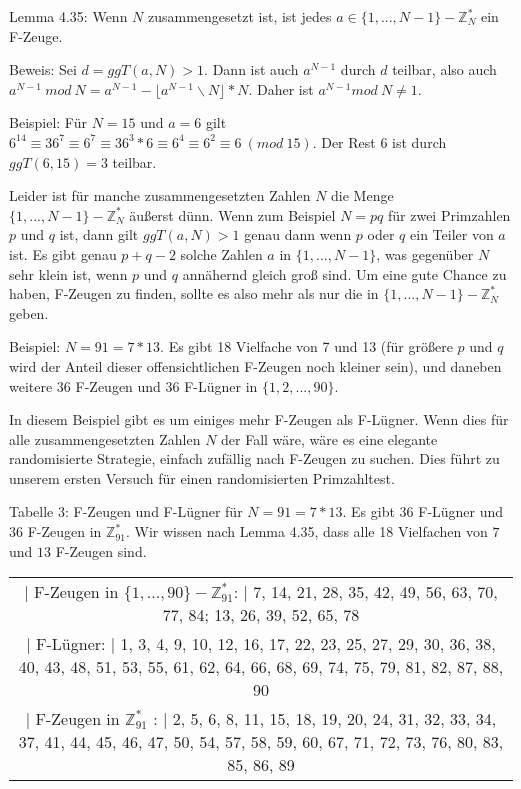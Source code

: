 \documentclass[a4paper]{article}
\begin{document}
\begin{multicols}{3}
        Lemma 4.35: Wenn $N$ zusammengesetzt ist, ist jedes $a\in\{1,...,N-1\}-\mathbb{Z}^*_N$ ein F-Zeuge.

        Beweis: Sei $d=ggT(a,N)>1$. Dann ist auch $a^{N-1}$ durch $d$ teilbar, also auch $a^{N-1}\ mod\ N=a^{N-1}- \lfloor a^{N-1}\backslash N\rfloor *N$. Daher ist $a^{N-1} mod\ N\not= 1$.

        Beispiel: Für $N=15$ und $a=6$ gilt $6^{14}\equiv 36^7\equiv 6^7 \equiv 36^3 * 6 \equiv 6^4 \equiv 6^2 \equiv 6\ (mod\ 15)$. Der Rest $6$ ist durch $ggT(6,15) = 3$ teilbar.

        Leider ist für manche zusammengesetzten Zahlen $N$ die Menge $\{1 ,...,N-1\}-\mathbb{Z}^*_N$ äußerst dünn. Wenn zum Beispiel $N=pq$ für zwei Primzahlen $p$ und $q$ ist, dann gilt $ggT(a,N)> 1$ genau dann wenn $p$ oder $q$ ein Teiler von $a$ ist. Es gibt genau $p+q-2$ solche Zahlen $a$ in $\{ 1 ,...,N-1\}$, was gegenüber $N$ sehr klein ist, wenn $p$ und $q$ annähernd gleich groß sind. Um eine gute Chance zu haben, F-Zeugen zu finden, sollte es also mehr als nur die in $\{1 ,...,N-1\}-\mathbb{Z}^*_N$ geben.

        Beispiel: $N=91 = 7*13$. Es gibt 18 Vielfache von 7 und 13 (für größere $p$ und $q$ wird der Anteil dieser offensichtlichen F-Zeugen noch kleiner sein), und daneben weitere $36$ F-Zeugen und $36$ F-Lügner in $\{1 , 2 ,..., 90\}$.

        In diesem Beispiel gibt es um einiges mehr F-Zeugen als F-Lügner. Wenn dies für alle zusammengesetzten Zahlen $N$ der Fall wäre, wäre es eine elegante randomisierte Strategie, einfach zufällig nach F-Zeugen zu suchen. Dies führt zu unserem ersten Versuch für einen randomisierten Primzahltest.

        Tabelle 3: F-Zeugen und F-Lügner für $N=91= 7*13$. Es gibt $36$ F-Lügner und $36$ F-Zeugen in $\mathbb{Z}^*_{91}$. Wir wissen nach Lemma 4.35, dass alle 18 Vielfachen von $7$ und $13$ F-Zeugen sind.
        \begin{tabular}{c}
        | F-Zeugen in $\{ 1 ,..., 90\}-\mathbb{Z}^*_{91}$: | 7, 14, 21, 28, 35, 42, 49, 56, 63, 70, 77, 84; 13, 26, 39, 52, 65, 78                                   \\
        | F-Lügner:                    | 1, 3, 4, 9, 10, 12, 16, 17, 22, 23, 25, 27, 29, 30, 36, 38, 40, 43, 48, 51, 53, 55, 61, 62, 64, 66, 68, 69, 74, 75, 79, 81, 82, 87, 88, 90 \\
        | F-Zeugen in $\mathbb{Z}^*_{91}$ :        | 2, 5, 6, 8, 11, 15, 18, 19, 20, 24, 31, 32, 33, 34, 37, 41, 44, 45, 46, 47, 50, 54, 57, 58, 59, 60, 67, 71, 72, 73, 76, 80, 83, 85, 86, 89 
        \end{tabular}


\end{multicols}
\end{document}
